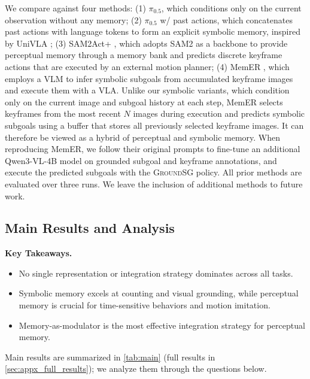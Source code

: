 We compare against four methods:
(1) $\pi_{0.5}$, which conditions only on the current observation without any memory;
(2) $\pi_{0.5}$ w/ past actions, which concatenates past actions with language tokens to form an explicit symbolic memory, inspired by UniVLA \cite{bu2025learning};
(3) SAM2Act+ \cite{fang2025sam2act}, which adopts SAM2 as a backbone to provide perceptual memory through a memory bank and predicts discrete keyframe actions that are executed by an external motion planner;
(4) MemER \cite{sridhar2025memer}, which employs a VLM to infer symbolic subgoals from accumulated keyframe images and execute them with a VLA.
Unlike our symbolic variants, which condition only on the current image and subgoal history at each step, MemER selects keyframes from the most recent $N$ images during execution and predicts symbolic subgoals using a buffer that stores all previously selected keyframe images. It can therefore be viewed as a hybrid of perceptual and symbolic memory. When reproducing MemER, we follow their original prompts to fine-tune an additional Qwen3-VL-4B model on grounded subgoal and keyframe annotations, and execute the predicted subgoals with the \textsc{GroundSG} policy.
All prior methods are evaluated over three runs. We leave the inclusion of additional methods to future work.


\subsection{Main Results and Analysis}



\noindent\textbf{Key Takeaways.}
\begin{itemize}[leftmargin=*,topsep=2pt,itemsep=0pt]
    \item No single representation or integration strategy dominates across all tasks.
    \item Symbolic memory excels at counting and visual grounding, while perceptual memory is crucial for time-sensitive behaviors and motion imitation.
    \item Memory-as-modulator is the most effective integration strategy for perceptual memory.
\end{itemize}


Main results are summarized in \cref{tab:main} (full results in \cref{sec:appx_full_results}); we analyze them through the questions below.

